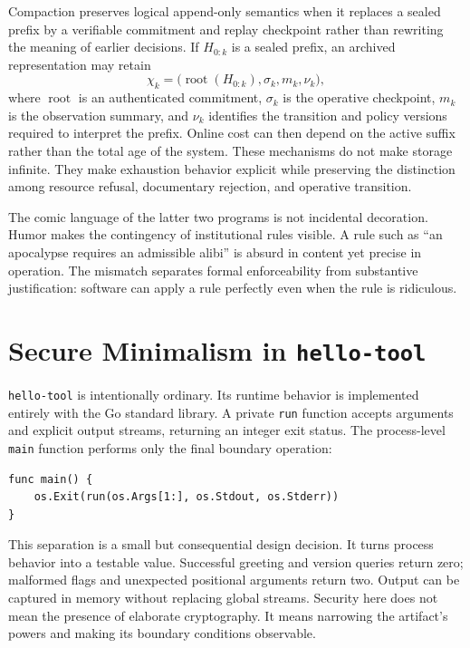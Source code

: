 \documentclass[11pt]{article}
\begin{document}
Compaction preserves logical append-only semantics when it replaces a sealed prefix by a verifiable commitment and replay checkpoint rather than rewriting the meaning of earlier decisions. If $H_{0:k}$ is a sealed prefix, an archived representation may retain
\begin{equation}
  \chi_k=\bigl(\operatorname{root}(H_{0:k}),\sigma_k,m_k,\nu_k\bigr),
  \label{eq:checkpoint}
\end{equation}
where $\operatorname{root}$ is an authenticated commitment, $\sigma_k$ is the operative checkpoint, $m_k$ is the observation summary, and $\nu_k$ identifies the transition and policy versions required to interpret the prefix. Online cost can then depend on the active suffix rather than the total age of the system. These mechanisms do not make storage infinite. They make exhaustion behavior explicit while preserving the distinction among resource refusal, documentary rejection, and operative transition.

The comic language of the latter two programs is not incidental decoration. Humor makes the contingency of institutional rules visible. A rule such as ``an apocalypse requires an admissible alibi'' is absurd in content yet precise in operation. The mismatch separates formal enforceability from substantive justification: software can apply a rule perfectly even when the rule is ridiculous.

\section{Secure Minimalism in \texttt{hello-tool}}

\texttt{hello-tool} is intentionally ordinary. Its runtime behavior is implemented entirely with the Go standard library. A private \texttt{run} function accepts arguments and explicit output streams, returning an integer exit status. The process-level \texttt{main} function performs only the final boundary operation:

\begin{lstlisting}[style=gostyle]
func main() {
    os.Exit(run(os.Args[1:], os.Stdout, os.Stderr))
}
\end{lstlisting}

This separation is a small but consequential design decision. It turns process behavior into a testable value. Successful greeting and version queries return zero; malformed flags and unexpected positional arguments return two. Output can be captured in memory without replacing global streams. Security here does not mean the presence of elaborate cryptography. It means narrowing the artifact's powers and making its boundary conditions observable.
\end{document}
